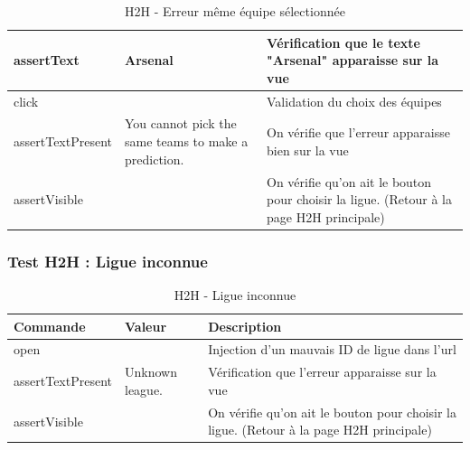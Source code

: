 \documentclass[a4paper,14pt]{extarticle}
\begin{document}
{\begin{table}[htp]
\begin{tabular}{|m{4cm}|m{4cm}|m{6cm}|}
    assertText        & Arsenal                                              & Vérification que le texte "Arsenal" apparaisse sur la vue                               \\ \hline
    click             &                                                      & Validation du choix des équipes                                                         \\ \hline
    assertTextPresent & You cannot pick the same teams to make a prediction. & On vérifie que l'erreur apparaisse bien sur la vue                                      \\ \hline
    assertVisible     &                                                      & On vérifie qu'on ait le bouton pour choisir la ligue. (Retour à la page H2H principale) \\ \hline
    \end{tabular}
    \label{tab:H2HMemeEquipes}
    \caption{H2H - Erreur même équipe sélectionnée}
\end{table}

\newpage

\subsubsection{Test H2H : Ligue inconnue}

\begin{table}[htp]
    \centering
    \begin{tabular}{|m{4cm}|m{4cm}|m{6cm}|}
    \hline
    \textbf{Commande} & \textbf{Valeur} & \textbf{Description}                                                                                                                              \\ \hline
    open              &                 & Injection d'un mauvais ID de ligue dans l'url \\ \hline
    assertTextPresent & Unknown league. & Vérification que l'erreur apparaisse sur la vue                                                                                                   \\ \hline
    assertVisible     &                 & On vérifie qu'on ait le bouton pour choisir la ligue. (Retour à la page H2H principale)                                                           \\ \hline
    \end{tabular}
    \label{tab:H2HLigueInconnue}
    \caption{H2H - Ligue inconnue}
\end{table}

}
\end{document}

